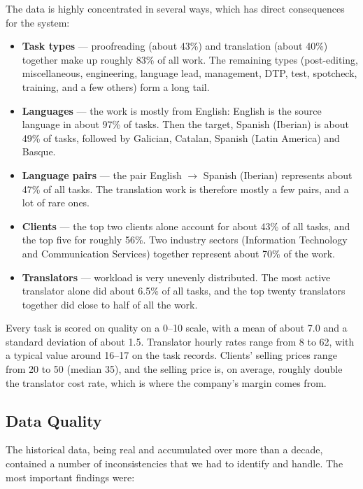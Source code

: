 \documentclass[9pt,a4paper,twoside]{utils/tau-class/tau}
\begin{document}
The data is highly concentrated in several ways, which has direct consequences for the system:

\begin{itemize}
    \item \textbf{Task types} --- proofreading (about 43\%) and translation (about 40\%) together make up roughly 83\% of all work. The remaining types (post-editing, miscellaneous, engineering, language lead, management, DTP, test, spotcheck, training, and a few others) form a long tail.
    \item \textbf{Languages} --- the work is mostly from English: English is the source language in about 97\% of tasks. Then the target, Spanish (Iberian) is about 49\% of tasks, followed by Galician, Catalan, Spanish (Latin America) and Basque.
    \item \textbf{Language pairs} --- the pair English $\rightarrow$ Spanish (Iberian) represents about 47\% of all tasks. The translation work is therefore mostly a few pairs, and a lot of rare ones.
    \item \textbf{Clients} --- the top two clients alone account for about 43\% of all tasks, and the top five for roughly 56\%. Two industry sectors (Information Technology and Communication Services) together represent about 70\% of the work.
    \item \textbf{Translators} --- workload is very unevenly distributed. The most active translator alone did about 6.5\% of all tasks, and the top twenty translators together did close to half of all the work.
\end{itemize}

Every task is scored on quality on a 0--10 scale, with a mean of about 7.0 and a standard deviation of about 1.5. Translator hourly rates range from 8 to 62, with a typical value around 16--17 on the task records. Clients' selling prices range from 20 to 50 (median 35), and the selling price is, on average, roughly double the translator cost rate, which is where the company's margin comes from.

\subsection{Data Quality}

The historical data, being real and accumulated over more than a decade, contained a number of inconsistencies that we had to identify and handle. The most important findings were:
\end{document}
